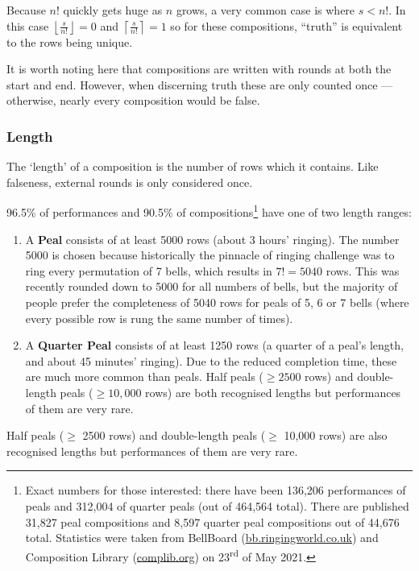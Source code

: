 \documentclass[12pt]{article}
\newcommand{\nth}[2]{#1\textsuperscript{#2}}
\begin{document}
Because $n!$ quickly gets huge as $n$ grows, a very common case is where $s < n!$. In this case
$\left\lfloor \frac{s}{n!} \right\rfloor = 0$ and $\left\lceil \frac{s}{n!} \right\rceil = 1$ so
for these compositions, ``truth'' is equivalent to the rows being unique.

It is worth noting here that compositions are written with rounds at both the start and end.
However, when discerning truth these are only counted once --- otherwise, nearly every composition
would be false.

\subsubsection{Length}

The `length' of a composition is the number of rows which it contains.  Like falseness, external
rounds is only considered once.

96.5\% of performances and 90.5\% of compositions\footnote{Exact numbers for those interested: there
have been 136,206 performances of peals and 312,004 of quarter peals (out of 464,564 total).  There
are published 31,827 peal compositions and 8,597 quarter peal compositions out of 44,676 total.
Statistics were taken from BellBoard (\url{bb.ringingworld.co.uk}) and Composition Library
(\url{complib.org}) on \nth{23}{rd} of May 2021.} have one of two length ranges:

\begin{enumerate}
    \item A \textbf{Peal} consists of at least 5000 rows (about 3 hours' ringing).
        The number 5000 is chosen because historically the pinnacle of ringing challenge was to ring
        every permutation of 7 bells, which results in $7! = 5040$ rows.  This was recently rounded
        down to 5000 for all numbers of bells, but the majority of people prefer the completeness of
        5040 rows for peals of 5, 6 or 7 bells (where every possible row is rung the same number of
        times).
    \item A \textbf{Quarter Peal} consists of at least 1250 rows (a quarter of a peal's length, and
        about 45 minutes' ringing).  Due to the reduced completion time, these are much more
        common than peals.  Half peals ($\ge 2500$ rows) and double-length peals ($\ge 10,000$ rows)
        are both recognised lengths but performances of them are very rare.
\end{enumerate}

Half peals ($\ge$ 2500 rows) and double-length peals ($\ge$ 10,000 rows) are also recognised lengths
but performances of them are very rare.
\end{document}

